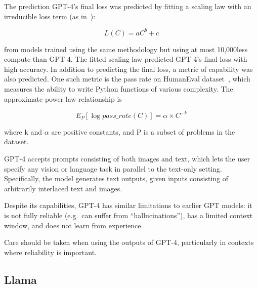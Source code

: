 The prediction GPT-4's final loss was predicted by fitting a scaling law with an irreducible loss term (as in~\textcite{henighan2020scaling}):

\begin{equation}
	L(C) = aC^b + c
	\label{eq:gpt4-scaling-law}
\end{equation}

\noindent from models trained using the same methodology but using at most 10,000\texttimes less compute than GPT-4.
The fitted scaling law predicted GPT-4's final loss with high accuracy.
In addition to predicting the final loss, a metric of capability was also predicted.
One such metric is the pass rate on HumanEval dataset~\cite{chen2021evaluating}, which measures the ability to write Python functions of various complexity.
The approximate power law relationship is

\begin{equation}
	E_P [\log{pass\_rate(C)}] = \alpha \times C^{-k}
	\label{eq:gpt4-pass-rate}
\end{equation}

\noindent where k and \(\alpha\) are positive constants, and P is a subset of problems in the dataset.

GPT-4 accepts prompts consisting of both images and text, which lets the user specify any vision or language task in parallel to the text-only setting.
Specifically, the model generates text outputs, given inputs consisting of arbitrarily interlaced text and images.

Despite its capabilities, GPT-4 has similar limitations to earlier GPT models: it is not fully reliable (e.g.\ can suffer from \enquote{hallucinations}), has a limited context window, and does not learn from experience.

Care should be taken when using the outputs of GPT-4, particularly in contexts where reliability is important.

\subsection{Llama}
\label{subsec:llama}

